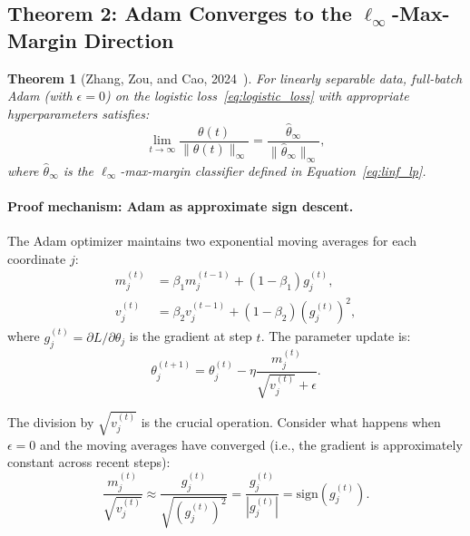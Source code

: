 \documentclass{article}
\newtheorem{theorem}{Theorem}
\begin{document}
\subsection{Theorem 2: Adam Converges to the $\ell_\infty$-Max-Margin Direction}
\label{sec:adam}

\begin{theorem}[Zhang, Zou, and Cao, 2024~\cite{zhang2024}]
\label{thm:adam}
For linearly separable data, full-batch Adam (with $\epsilon = 0$) on the logistic loss~\eqref{eq:logistic_loss} with appropriate hyperparameters satisfies:
\begin{equation}
    \lim_{t \to \infty} \frac{\theta(t)}{\|\theta(t)\|_\infty} = \frac{\hat{\theta}_\infty}{\|\hat{\theta}_\infty\|_\infty},
\end{equation}
where $\hat{\theta}_\infty$ is the $\ell_\infty$-max-margin classifier defined in Equation~\eqref{eq:linf_lp}.
\end{theorem}

\paragraph{Proof mechanism: Adam as approximate sign descent.}

The Adam optimizer maintains two exponential moving averages for each coordinate $j$:
\begin{align}
    m_j^{(t)} &= \beta_1 m_j^{(t-1)} + (1-\beta_1) g_j^{(t)}, \label{eq:adam_m} \\
    v_j^{(t)} &= \beta_2 v_j^{(t-1)} + (1-\beta_2) (g_j^{(t)})^2, \label{eq:adam_v}
\end{align}
where $g_j^{(t)} = \partial L / \partial \theta_j$ is the gradient at step $t$. The parameter update is:
\begin{equation}
    \theta_j^{(t+1)} = \theta_j^{(t)} - \eta \frac{m_j^{(t)}}{\sqrt{v_j^{(t)}} + \epsilon}.
    \label{eq:adam_update}
\end{equation}

The division by $\sqrt{v_j^{(t)}}$ is the crucial operation. Consider what happens when $\epsilon = 0$ and the moving averages have converged (i.e., the gradient is approximately constant across recent steps):
\begin{equation}
    \frac{m_j^{(t)}}{\sqrt{v_j^{(t)}}} \approx \frac{g_j^{(t)}}{\sqrt{(g_j^{(t)})^2}} = \frac{g_j^{(t)}}{|g_j^{(t)}|} = \text{sign}(g_j^{(t)}).
\end{equation}
\end{document}
